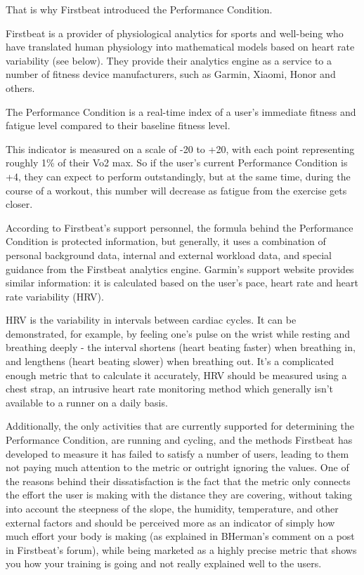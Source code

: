That is why Firstbeat introduced the Performance Condition.

Firstbeat is a provider of physiological analytics for sports and well-being who have translated human physiology into mathematical models based on heart rate variability (see below).
They provide their analytics engine as a service to a number of fitness device manufacturers, such as Garmin, Xiaomi, Honor and others.

The Performance Condition is a real-time index of a user's immediate fitness and fatigue level compared to their baseline fitness level.

This indicator is measured on a scale of -20 to +20, with each point representing roughly 1\% of their Vo2 max.
So if the user's current Performance Condition is +4, they can expect to perform outstandingly,
but at the same time, during the course of a workout, this number will decrease as fatigue from the exercise gets closer.\cite{performance-condition-firstbeat}\cite{performance-condition-garmin}

According to Firstbeat's support personnel, the formula behind the Performance Condition is protected information,
but generally, it uses a combination of personal background data, internal and external workload data, and special guidance from the Firstbeat analytics engine.\cite{firstbeat-performance-condition-emails}
Garmin's support website provides similar information: it is calculated based on the user's pace, heart rate and heart rate variability (HRV).\cite{performance-condition-garmin}

HRV is the variability in intervals between cardiac cycles.
It can be demonstrated, for example, by feeling one's pulse on the wrist while resting and breathing deeply - the interval shortens (heart beating faster) when breathing in, and lengthens (heart beating slower) when breathing out.\cite{hrv}
It's a complicated enough metric that to calculate it accurately, HRV should be measured using a chest strap,
an intrusive heart rate monitoring method which generally isn't available to a runner on a daily basis.

Additionally, the only activities that are currently supported for determining the Performance Condition, are running and cycling,
and the methods Firstbeat has developed to measure it has failed to satisfy a number of users, leading to them not paying much attention to the metric or outright ignoring the values.\cite{performance-condition-unreliable1}\cite{performance-condition-unreliable-reasoning}
One of the reasons behind their dissatisfaction is the fact that the metric only connects the effort the user is making with the distance they are covering,
 without taking into account the steepness of the slope, the humidity, temperature, and other external factors 
 and should be perceived more as an indicator of simply how much effort your body is making (as explained in BHerman's comment on a post\cite{performance-condition-unreliable-reasoning} in Firstbeat's forum), 
while being marketed as a highly precise metric that shows you how your training is going and not really explained well to the users.


